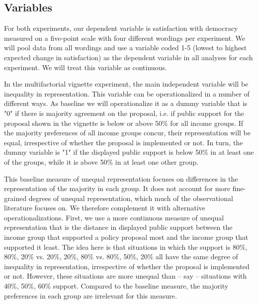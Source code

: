 \documentclass[12pt, letterpaper]{article}
\begin{document}
\begin{spacing}{1.5}
\subsection*{Variables}

For both experiments, our dependent variable is satisfaction with democracy measured on a five-point scale with four different wordings per experiment. We will pool data from all wordings and use a variable coded 1-5 (lowest to highest expected change in satisfaction) as the dependent variable in all analyses for each experiment. We will treat this variable as continuous.

In the multifactorial vignette experiment, the main independent variable will be inequality in representation. This variable can be operationalized in a number of different ways. As baseline we will operationalize it as a dummy variable that is "0" if there is majority agreement on the proposal, i.e. if public support for the proposal shown in the vignette is below or above 50\% for all income groups. If the majority preferences of all income groups concur, their representation will be equal, irrespective of whether the proposal is implemented or not. In turn, the dummy variable is "1" if the displayed public support is below 50\% in at least one of the groups, while it is above 50\% in at least one other group.

This baseline measure of unequal representation focuses on differences in the representation of the majority in each group. It does not account for more fine- grained degrees of unequal representation, which much of the observational literature focuses on. We therefore complement it with alternative operationalizations. First, we use a more continuous measure of unequal representation that is the distance in displayed public support between the income group that supported a policy proposal most and the income group that supported it least. The idea here is that situations in which the support is 80\%, 80\%, 20\% vs. 20\%, 20\%, 80\% vs. 80\%, 50\%, 20\% all have the same degree of inequality in representation, irrespective of whether the proposal is implemented or not. However, these situations are more unequal than – say – situations with 40\%, 50\%, 60\% support. Compared to the baseline measure, the majority preferences in each group are irrelevant for this measure.


\end{spacing}
\end{document}
